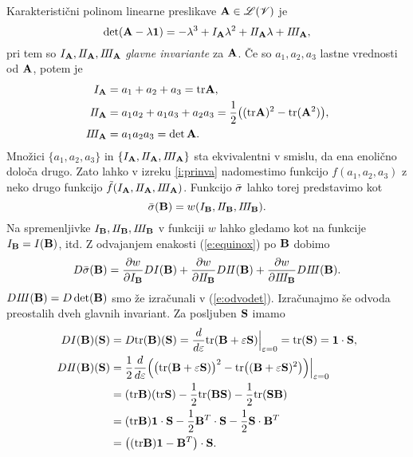 Karakteristični polinom linearne preslikave $\mathbf A\in\mathscr L(\mathscr V)$ je
\[
	\det(\mathbf A-\lambda\mathbf 1)=-\lambda^3+I_{\mathbf A}\lambda^2+I\! I_{\mathbf A}\lambda+I\! I\! I_{\mathbf A},
\]
pri tem so $I_{\mathbf A}, I\! I_{\mathbf A}, I\! I\! I_{\mathbf A}$ \emph{glavne invariante} za $\mathbf A$.
Če so $a_1,a_2,a_3$ lastne vrednosti od $\mathbf A$, potem je
\begin{align*}
	I_{\mathbf A}&=a_1+a_2+a_3=\mathrm{tr}\mathbf A,\\
	I\! I_{\mathbf A}&=a_1a_2+a_1a_3+a_2a_3=\frac{1}{2}\big((\mathrm{tr}\mathbf A)^2-\mathrm{tr}(\mathbf A^2)\big),\\
	I\! I\! I_{\mathbf A}&=a_1a_2a_3=\det\mathbf A.
\end{align*}
Množici $\{a_1,a_2,a_3\}$ in $\{I_{\mathbf A},I\! I_{\mathbf A},I\! I\! I_{\mathbf A}\}$ sta ekvivalentni
v smislu, da ena enoli\-čno določa drugo. Zato lahko v izreku \ref{i:prinva} nadomestimo
funkcijo $f(a_1,a_2,a_3)$ z neko drugo funkcijo $\tilde{f}(I_{\mathbf A},I\! I_{\mathbf A},I\! I\! I_{\mathbf A})$.
Funkcijo $\bar{\sigma}$ lahko torej predstavimo kot
\begin{equation} \label{e:equinox}
	\bar{\sigma}(\mathbf B)=w(I_{\mathbf B},I\! I_{\mathbf B},I\! I\! I_{\mathbf B}).
\end{equation}
Na spremenljivke $I_{\mathbf B},I\! I_{\mathbf B},I\! I\! I_{\mathbf B}$ v funkciji $w$ lahko gledamo kot
na funkcije $I_{\mathbf B}=I(\mathbf B)$, itd. Z odvajanjem enakosti (\ref{e:equinox}) po $\mathbf B$ dobimo
\begin{equation} \label{e:dbshy}
	D\bar{\sigma}(\mathbf B)=\frac{\partial w}{\partial I_{\mathbf B}}DI(\mathbf B)+
	\frac{\partial w}{\partial I\! I_{\mathbf B}}DI\! I(\mathbf B)+
	\frac{\partial w}{\partial I\! I\! I_{\mathbf B}}DI\! I\! I(\mathbf B).
\end{equation}
$DI\! I\! I(\mathbf B)=D\det(\mathbf B)$ smo že izračunali v (\ref{e:odvodet}). Izračunajmo še
odvoda preostalih dveh glavnih invariant. Za posljuben $\mathbf S$ imamo
\begin{align*}
	DI(\mathbf B)(\mathbf S)&=D\mathrm{tr}(\mathbf B)(\mathbf S)=
	\frac{d}{d\varepsilon}\mathrm{tr}(\mathbf B+\varepsilon\mathbf S)\Big|_{\varepsilon=0}=
	\mathrm{tr}(\mathbf S)=\mathbf 1\cdot\mathbf S,\\
	DI\! I(\mathbf B)(\mathbf S)&=
	\frac{1}{2}\frac{d}{d\varepsilon}\Big(
	\big(\mathrm{tr}(\mathbf B+\varepsilon\mathbf S)\big)^2-\mathrm{tr}\big((\mathbf B+\varepsilon\mathbf S)^2\big)
	\Big)\Big|_{\varepsilon=0}\\
	&=(\mathrm{tr}\mathbf B)(\mathrm{tr}\mathbf S)-\frac{1}{2}\mathrm{tr}(\mathbf B\mathbf S)-\frac{1}{2}\mathrm{tr}(\mathbf S\mathbf B)\\
	&=(\mathrm{tr}\mathbf B)\mathbf 1\cdot\mathbf S-\frac{1}{2}\mathbf B^T\cdot\mathbf S-\frac{1}{2}\mathbf S\cdot\mathbf B^T\\
	&=\big((\mathrm{tr}\mathbf B)\mathbf 1-\mathbf B^T\big)\cdot\mathbf S.
\end{align*}
